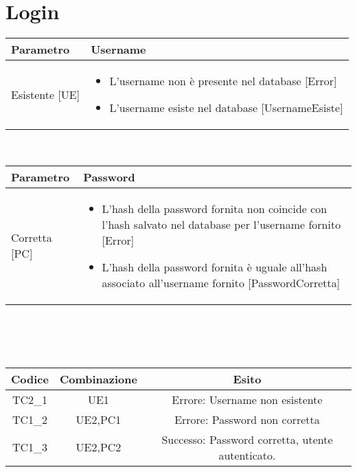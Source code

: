 \section{Login}
\begin{tabular}{|| l | p{25em} ||} 
	\hline
	Parametro & Username\\
	\hline
	Esistente [UE] & \begin{itemize}
	\item L'username non è presente nel database [Error] 
	\item L'username esiste nel database [UsernameEsiste]
	\end{itemize}\\
	\hline
\end{tabular}
\\
\begin{tabular}{|| l | p{25em} ||} 
	\hline
	Parametro & Password\\
	\hline
	Corretta [PC] & \begin{itemize}
	\item L'hash della password fornita non coincide con l'hash salvato nel database per l'username fornito [Error]
	\item L'hash della password fornita è uguale all'hash associato all'username fornito [PasswordCorretta]
	\end{itemize}\\
	\hline
\end{tabular}
\\\\\\
\begin{tabular}{|| c | c | c ||}
	\hline
	Codice & Combinazione & Esito\\
	\hline
	TC2\_1 & UE1 & Errore: Username non esistente \\
	\hline
	TC1\_2 & UE2,PC1 & Errore: Password non corretta \\
	\hline
	TC1\_3 & UE2,PC2 & Successo: Password corretta, utente autenticato. \\
	\hline
\end{tabular}

